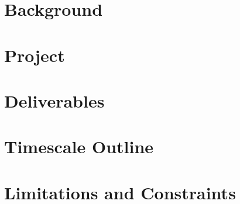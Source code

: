 \section{Background}
\label{sec:background}

\section{Project}
\label{sec:project}

\section{Deliverables}
\label{sec:deliverables}

\section{Timescale Outline}
\label{sec:timescale_outline}

\section{Limitations and Constraints}
\label{sec:limitations_and_constraints}
